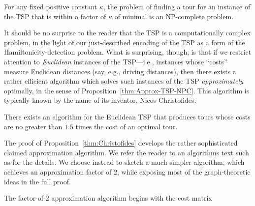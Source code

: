 \begin{prop}
\label{thm:Approx-TSP-NPC}
For any fixed positive constant $\kappa$, the problem of finding a tour for an instance of the TSP that is within a factor of $\kappa$ of minimal is an {\sf NP}-complete problem.
\end{prop}


It should be no surprise to the reader that the TSP is a computationally complex problem, in the light of our just-described encoding of the TSP as a form of the Hamiltonicity-detection problem.  What is surprising, though, is that if we restrict attention to {\em Euclidean} instances of the TSP---i.e., instances whose ``costs'' measure Euclidean distances (say, e.g., driving distances), then there exists a rather efficient algorithm which solves such instances of the TSP {\em approximately} optimally, in the sense of Proposition~\ref{thm:Approx-TSP-NPC}.  %
This algorithm is typically known by the name of its inventor, Nicos Christofides.

\begin{prop}
\label{thm:Christofides}
There exists an algorithm for the Euclidean TSP that produces tours whose costs are no greater than $1.5$ times the cost of an optimal tour.
\end{prop}

The proof of Proposition~\ref{thm:Christofides} develops the rather sophisticated claimed approximation algorithm.  We refer the reader to an algorithms text such as \cite{CLRS} for the details.  We choose instead to sketch a much simpler algorithm, which achieves an approximation factor of $2$, while exposing most of the graph-theoretic ideas in the full proof.   

The factor-of-$2$ approximation algorithm begins with the cost matrix

